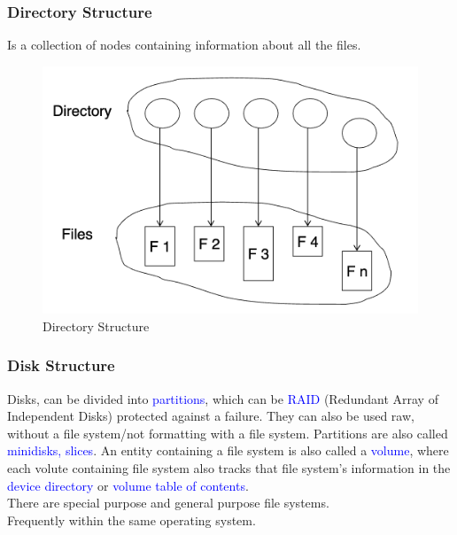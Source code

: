 \documentclass[oneside]{book}
\begin{document}
                \subsubsection{Directory Structure}
                        Is a collection of nodes containing information about all the files.\\
                        \begin{figure}[H]
                            \centering
                            \includegraphics[width=0.6\linewidth]{figures/directory_structure.png}
                            \caption{Directory Structure}
                        \end{figure}
                    \subsubsection{Disk Structure}
                        Disks, can be divided into \textcolor{blue}{partitions}, which can be \textcolor{blue}{RAID}
                        (Redundant Array of Independent Disks) protected against a failure. They can also be used raw,
                        without a file system/not formatting with a file system. Partitions are also called \textcolor{blue}{minidisks, slices}.
                        An entity containing a file system is also called a \textcolor{blue}{volume}, where each volute containing file
                        system also tracks that file system's information in the \textcolor{blue}{device directory} or
                        \textcolor{blue}{volume table of contents}.\\
                        There are special purpose and general purpose file systems.\\
                        Frequently within the same operating system.
\end{document}
